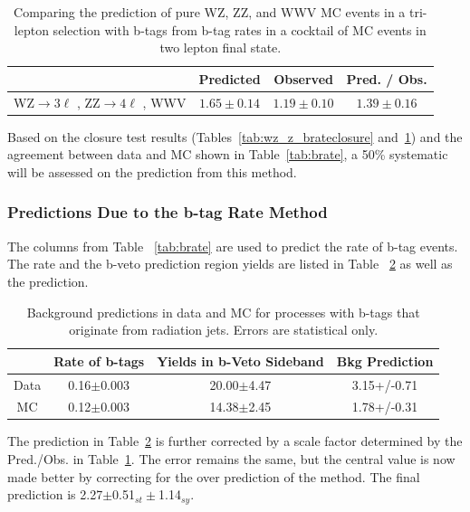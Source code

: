 \begin{table}[ht!]
\begin{center}

\begin{tabular}{c|ccc}\hline
                                                                                               & Predicted             & Observed          & Pred. / Obs.\\
\hline \hline
WZ$\rightarrow 3\ell $ , ZZ$\rightarrow 4\ell $ , WWV & $1.65 \pm 0.14$ & $1.19\pm0.10$ & $1.39 \pm 0.16$ \\
\hline
\end{tabular}
\caption{ \label{tab:mcsoup_brateclosure} Comparing the prediction of pure WZ, ZZ, and WWV MC events in a tri-lepton selection with b-tags from b-tag rates in a cocktail of MC events in two lepton final state.}
\end{center}
\end{table}

Based on the closure test results (Tables~\ref{tab:wz_z_brateclosure} and~\ref{tab:mcsoup_brateclosure}) and the agreement between data and MC shown in Table~\ref{tab:brate}, a 50\% systematic will be assessed on the prediction from this method.\\
		
		
        		\subsubsection{Predictions Due to the b-tag Rate Method}
		The columns from Table ~\ref{tab:brate} are used to predict the rate of b-tag events. The rate and the b-veto prediction region yields are listed in Table ~\ref{tab:brate_prediction} as well as the prediction.
\begin{table}[ht!]
\begin{center}

\begin{tabular}{c|ccc}\hline
	   & Rate of b-tags	& Yields in b-Veto Sideband &	Bkg Prediction \\ \hline
Data   & 0.16$\pm$0.003	& 20.00$\pm$4.47            & 3.15+/-0.71 \\
MC	   & 0.12$\pm$0.003	& 14.38$\pm$2.45            & 1.78+/-0.31 \\
\hline
\end{tabular}
\caption{ \label{tab:brate_prediction} Background predictions in data and MC for processes with b-tags that originate from radiation jets. Errors are statistical only.}
\end{center}
\end{table}

The prediction in Table~\ref{tab:brate_prediction} is further corrected by a scale factor determined by the Pred./Obs. in Table~\ref{tab:mcsoup_brateclosure}. The error remains the same, but the central value is now made better by correcting for the over prediction of the method. The final prediction is 2.27$\pm$0.51$_{st} \pm$1.14$_{sy}$.
		
